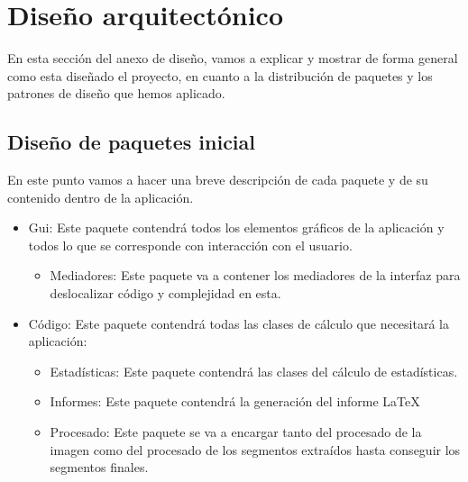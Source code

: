 \section{Diseño arquitectónico}

En esta sección del anexo de diseño, vamos a explicar y mostrar de forma general como esta diseñado el proyecto, en cuanto a la distribución de paquetes y los patrones de diseño que hemos aplicado.

\subsection{Diseño de paquetes inicial}

En este punto vamos a hacer una breve descripción de cada paquete y de su contenido dentro de la aplicación.

\begin{itemize}
\item Gui:
Este paquete contendrá todos los elementos gráficos de la aplicación y todos lo que se corresponde con interacción con el usuario.
	\begin{itemize}
	\item Mediadores:
	Este paquete va a contener los mediadores de la interfaz para deslocalizar código y complejidad en esta.
	\end{itemize}
\item Código: Este paquete contendrá todas las clases de cálculo que necesitará la aplicación:
	\begin{itemize}
	\item Estadísticas:
	Este paquete contendrá las clases del cálculo de estadísticas.
	\item Informes:
	Este paquete contendrá la generación del informe \LaTeX
	\item Procesado:
	Este paquete se va a encargar tanto del procesado de la imagen 			como del procesado de los segmentos extraídos hasta conseguir los 		segmentos finales.
	\end{itemize}
\end{itemize}

